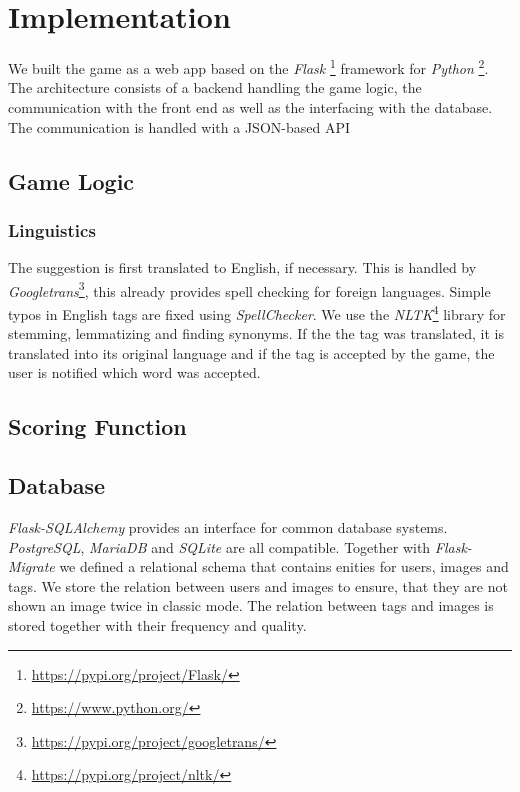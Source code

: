 \section{Implementation}
\label{g14:sec:implementation}


We built the game as a web app based on the \textit{Flask} \footnote{\url{https://pypi.org/project/Flask/}} framework for \textit{Python} \footnote{\url{https://www.python.org/}}. The architecture consists of a backend handling the game logic, the communication with the front end as well as the interfacing with the database. The communication is handled with a JSON-based API

\subsection{Game Logic}
\label{g14:sec:implementation:game}



\subsubsection{Linguistics}
\label{g14:sec:implementation:linguistics}
The suggestion is first translated to English, if necessary. This is handled by \textit{Googletrans}\footnote{\url{https://pypi.org/project/googletrans/}}, this already provides spell checking for foreign languages.
Simple typos in English tags are fixed using \textit{SpellChecker}. We use the \textit{NLTK}\footnote{\url{https://pypi.org/project/nltk/}} library for stemming, lemmatizing and finding synonyms. If the the tag was translated, it is translated into its original language and if the tag is accepted by the game, the user is notified which word was accepted.

\subsection{Scoring Function}

\subsection{Database}
\label{g14:sec:implementation:database}
\textit{Flask-SQLAlchemy} provides an interface for common database systems. \textit{PostgreSQL}, \textit{MariaDB} and \textit{SQLite} are all compatible.
Together with \textit{Flask-Migrate} we defined a relational schema that contains enities for users, images and tags. We store the relation between users and images to ensure, that they are not shown an image twice in classic mode. The relation between tags and images is stored together with their frequency and quality.

